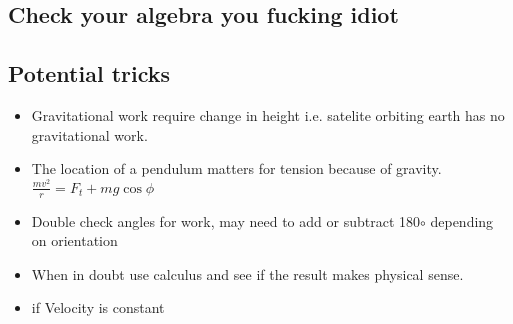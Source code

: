\documentclass{article}
\begin{document}
\begin{multicols}{2}
\subsection*{Check your algebra you fucking idiot}
\subsection*{Potential tricks}
\begin{itemize}
	\item Gravitational work require change in height i.e. satelite orbiting earth has no gravitational work.
	\item The location of a pendulum matters for tension because of gravity. $\frac{mv^2}{r} = F_t + mg\cos \phi$
	\item Double check angles for work, may need to add or subtract 180$\circ$ depending on orientation
	\item When in doubt use calculus and see if the result makes physical sense.
	\item if Velocity is constant
\end{itemize}

\end{multicols}
\end{document}
